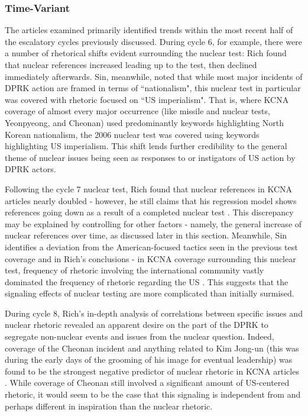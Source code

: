 \documentclass{article}
\begin{document}
\subsubsection{Time-Variant}

The articles examined primarily identified trends within the most recent half of the escalatory cycles previously discussed. During cycle 6, for example, there were a number of rhetorical shifts evident surrounding the nuclear test: Rich found that nuclear references increased leading up to the test, then declined immediately afterwards\cite{rich14}. Sin, meanwhile, noted that while most major incidents of DPRK action are framed in terms of ``nationalism", this nuclear test in particular was covered with rhetoric focused on ``US imperialism"\cite{sin}. That is, where KCNA coverage of almost every major occurrence (like missile and nuclear tests, Yeonpyeong, and Cheonan) used predominantly keywords highlighting North Korean nationalism, the 2006 nuclear test was covered using keywords highlighting US imperialism. This shift lends further credibility to the general theme of nuclear issues being seen as responses to or instigators of US action by DPRK actors.

Following the cycle 7 nuclear test, Rich found that nuclear references in KCNA articles nearly doubled - however, he still claims that his regression model shows references going down as a result of a completed nuclear test \cite{rich14}. This discrepancy may be explained by controlling for other factors - namely, the general increase of nuclear references over time, as discussed later in this section. Meanwhile, Sin identifies a deviation from the American-focused tactics seen in the previous test coverage and in Rich's conclusions - in KCNA coverage surrounding this nuclear test, frequency of rhetoric involving the international community vastly dominated the frequency of rhetoric regarding the US \cite{sin}. This suggests that the signaling effects of nuclear testing are more complicated than initially surmised.

During cycle 8, Rich's in-depth analysis of correlations between specific issues and nuclear rhetoric revealed an apparent desire on the part of the DPRK to segregate non-nuclear events and issues from the nuclear question. Indeed, coverage of the Cheonan incident and anything related to Kim Jong-un (this was during the early days of the grooming of his image for eventual leadership) was found to be the strongest negative predictor of nuclear rhetoric in KCNA articles \cite{rich12}. While coverage of Cheonan still involved a significant amount of US-centered rhetoric\cite{sin}, it would seem to be the case that this signaling is independent from and perhaps different in inspiration than the nuclear rhetoric.
\end{document}
